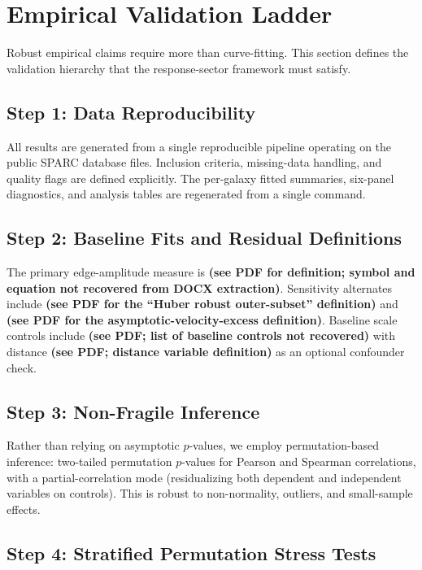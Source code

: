 \section{Empirical Validation Ladder}

Robust empirical claims require more than curve-fitting. This section defines the validation hierarchy that the response-sector framework must satisfy.

\subsection{Step 1: Data Reproducibility}

All results are generated from a single reproducible pipeline operating on the public SPARC database files. Inclusion criteria, missing-data handling, and quality flags are defined explicitly. The per-galaxy fitted summaries, six-panel diagnostics, and analysis tables are regenerated from a single command.

\subsection{Step 2: Baseline Fits and Residual Definitions}

The primary edge-amplitude measure is \textbf{(see PDF for definition; symbol and equation not recovered from DOCX extraction)}. Sensitivity alternates include \textbf{(see PDF for the ``Huber robust outer-subset'' definition)} and \textbf{(see PDF for the asymptotic-velocity-excess definition)}. Baseline scale controls include \textbf{(see PDF; list of baseline controls not recovered)} with distance \textbf{(see PDF; distance variable definition)} as an optional confounder check.

\subsection{Step 3: Non-Fragile Inference}

Rather than relying on asymptotic $p$-values, we employ permutation-based inference: two-tailed permutation $p$-values for Pearson and Spearman correlations, with a partial-correlation mode (residualizing both dependent and independent variables on controls). This is robust to non-normality, outliers, and small-sample effects.

\subsection{Step 4: Stratified Permutation Stress Tests}

